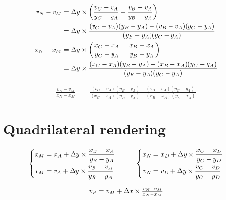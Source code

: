 \begin{align*}
v_N - v_M & = \Delta y \times \left(\frac{v_C - v_A}{y_C - y_A} - \frac{v_B - v_A}{y_B - y_A}\right) \\
& = \Delta y \times \frac{(v_C - v_A)(y_B - y_A) - (v_B - v_A)(y_C - y_A)}{(y_B - y_A)(y_C - y_A)}
\\
x_N - x_M & = \Delta y \times \left(\frac{x_C - x_A}{y_C - y_A} - \frac{x_B - x_A}{y_B - y_A}\right) \\
& = \Delta y \times \frac{(x_C - x_A)(y_B - y_A) - (x_B - x_A)(y_C - y_A)}{(y_B - y_A)(y_C - y_A)}
\end{align*}

\begin{align*}
\frac{v_N - v_M}{x_N - x_M} & = \frac{(v_C - v_A)(y_B - y_A) - (v_B - v_A)(y_C - y_A)}{(x_C - x_A)(y_B - y_A) - (x_B - x_A)(y_C - y_A)}
\end{align*}

\section{Quadrilateral rendering}


\begin{displaymath}
  \begin{array}{c}
    \begin{array}{c@{\quad\quad\quad}c}
      \left\{
        \begin{aligned}
          x_M & = x_A + \dy \times \frac{x_B - x_A}{y_B - y_A} \\
          v_M & = v_A + \dy \times \frac{v_B - v_A}{y_B - y_A} 
        \end{aligned}
      \right.
      &
      \left\{
        \begin{aligned}
          x_N & = x_D + \dy \times \frac{x_C - x_D}{y_C - y_D} \\
          v_N & = v_D + \dy \times \frac{v_C - v_D}{y_C - y_D} \\
        \end{aligned}
      \right.
    \end{array}
    \\
    \\
    v_P = v_M + \dx \times \frac{v_N - v_M}{x_N - x_M}
  \end{array}
\end{displaymath}

